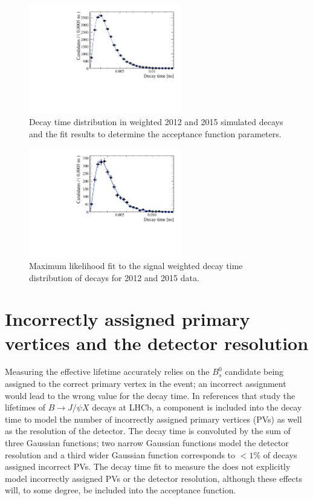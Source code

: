 \begin{figure}[tbp]
\centering
  \includegraphics[width=0.6\textwidth]{./Figs/LifetimeSystematics/Bs2KK_acceptance_Fit.pdf}
\caption{Decay time distribution in weighted 2012 and 2015 simulated decays and the fit  results to determine the acceptance function parameters. }
\label{fig:bskkacceptancefit}
\end{figure}

\begin{figure}[tbp]
\centering
  \includegraphics[width=0.6\textwidth]{./Figs/LifetimeSystematics/Bd2KPi_lifetime_fit.pdf}
\caption{Maximum likelihood fit to the signal weighted decay time distribution of \bskk decays for 2012 and 2015 data. }
\label{fig:bskklifetimefit}
\end{figure}

\section{Incorrectly assigned primary vertices and the detector resolution}
\label{sec:PVcheck}
Measuring the \bsmumu effective lifetime accurately relies on the $B^{0}_{s}$ candidate being assigned to the correct primary vertex in the event; an incorrect assignment would lead to the wrong value for the \bs decay time. %
In references \cite{Aaij:2016ohx,Aaij:2015vza} that study the lifetimes of $B \to J/\psi X$ decays at LHCb, a component is included into the decay time \pdf to model the number of incorrectly assigned primary vertices (PVs) as well as the resolution of the detector. The decay time \pdf is convoluted by the sum of three Gaussian functions; two narrow Gaussian functions model the detector resolution  and a third wider Gaussian function corresponds to $<1\%$ of decays assigned incorrect PVs. The decay time fit to measure the \bsmumu \el does not explicitly model incorrectly assigned PVs or the detector resolution, although these effects will, to some degree, be included into the acceptance function. 


